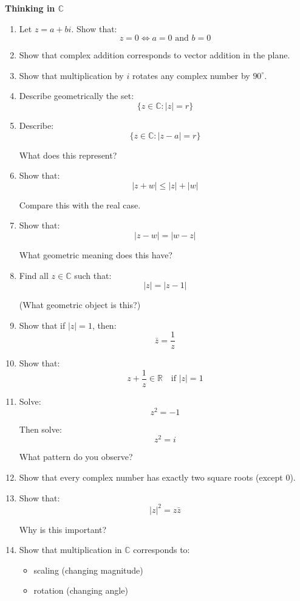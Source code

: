 \documentclass[11pt]{article}
\newcommand{\R}{\mathbb{R}}
\newcommand{\C}{\mathbb{C}}
\begin{document}
\begin{problembox}

\textbf{Thinking in $\C$}

\begin{enumerate}

\item Let $z = a + bi$. Show that:
\[
z = 0 \iff a = 0 \text{ and } b = 0
\]

\item Show that complex addition corresponds to vector addition in the plane.

\item Show that multiplication by $i$ rotates any complex number by $90^\circ$.

\item Describe geometrically the set:
\[
\{z \in \C : |z| = r\}
\]

\item Describe:
\[
\{z \in \C : |z - a| = r\}
\]

What does this represent?

\item Show that:
\[
|z+w| \le |z| + |w|
\]

Compare this with the real case.

\item Show that:
\[
|z-w| = |w-z|
\]

What geometric meaning does this have?

\item Find all $z \in \C$ such that:
\[
|z| = |z - 1|
\]

(What geometric object is this?)

\item Show that if $|z| = 1$, then:
\[
\bar{z} = \frac{1}{z}
\]

\item Show that:
\[
z + \frac{1}{z} \in \R \quad \text{if } |z| = 1
\]

\item Solve:
\[
z^2 = -1
\]

Then solve:
\[
z^2 = i
\]

What pattern do you observe?

\item Show that every complex number has exactly two square roots (except $0$).

\item Show that:
\[
|z|^2 = z\bar{z}
\]

Why is this important?

\item Show that multiplication in $\C$ corresponds to:
\begin{itemize}
\item scaling (changing magnitude)
\item rotation (changing angle)
\end{itemize}


\end{enumerate}
\end{problembox}
\end{document}
